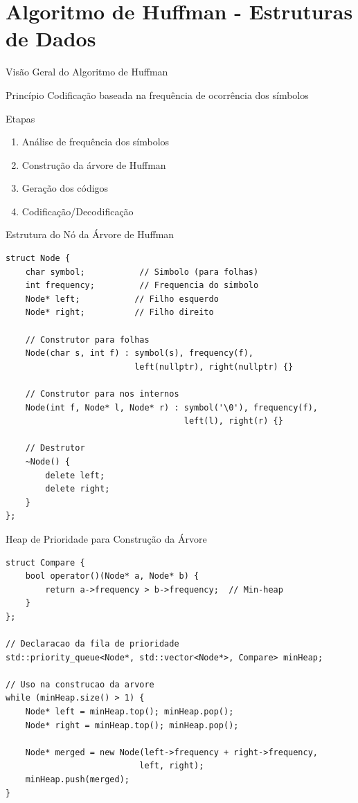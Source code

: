 \documentclass{beamer}
\begin{document}
\section{Algoritmo de Huffman - Estruturas de Dados}
\begin{frame}{Visão Geral do Algoritmo de Huffman}
    \begin{block}{Princípio}
        Codificação baseada na frequência de ocorrência dos símbolos
    \end{block}
    \begin{block}{Etapas}
        \begin{enumerate}
            \item Análise de frequência dos símbolos
            \item Construção da árvore de Huffman
            \item Geração dos códigos
            \item Codificação/Decodificação
        \end{enumerate}
    \end{block}
\end{frame}

\begin{frame}[fragile]{Estrutura do Nó da Árvore de Huffman}
    \begin{lstlisting}[style=CStyle, caption=Definição da estrutura Node]
struct Node {
    char symbol;           // Simbolo (para folhas)
    int frequency;         // Frequencia do simbolo
    Node* left;           // Filho esquerdo
    Node* right;          // Filho direito
    
    // Construtor para folhas
    Node(char s, int f) : symbol(s), frequency(f), 
                          left(nullptr), right(nullptr) {}
    
    // Construtor para nos internos
    Node(int f, Node* l, Node* r) : symbol('\0'), frequency(f), 
                                    left(l), right(r) {}
    
    // Destrutor
    ~Node() {
        delete left;
        delete right;
    }
};
    \end{lstlisting}
\end{frame}

\begin{frame}[fragile]{Heap de Prioridade para Construção da Árvore}
    \begin{lstlisting}[style=CStyle, caption=Comparador para priority\_queue]
struct Compare {
    bool operator()(Node* a, Node* b) {
        return a->frequency > b->frequency;  // Min-heap
    }
};

// Declaracao da fila de prioridade
std::priority_queue<Node*, std::vector<Node*>, Compare> minHeap;

// Uso na construcao da arvore
while (minHeap.size() > 1) {
    Node* left = minHeap.top(); minHeap.pop();
    Node* right = minHeap.top(); minHeap.pop();
    
    Node* merged = new Node(left->frequency + right->frequency, 
                           left, right);
    minHeap.push(merged);
}
    \end{lstlisting}
\end{frame}
\end{document}
